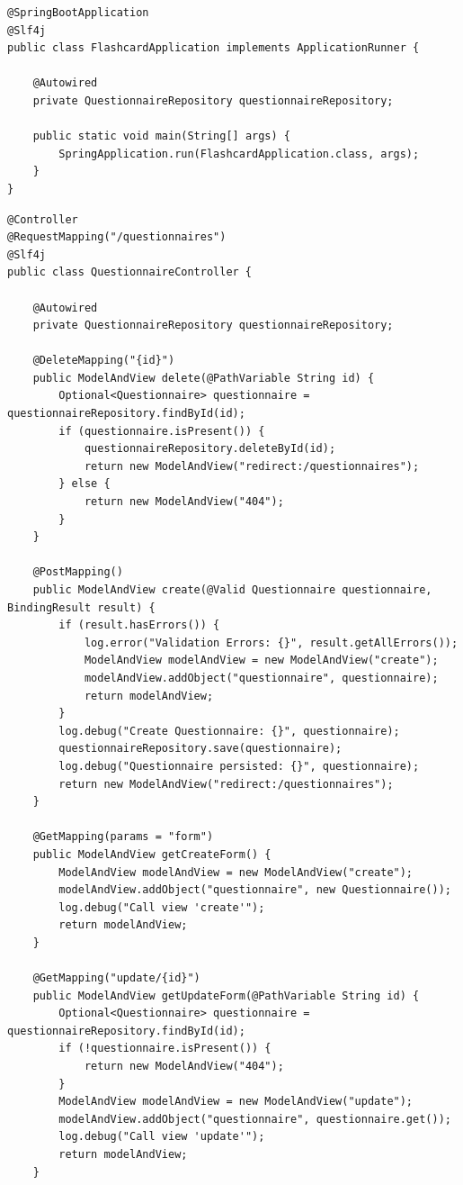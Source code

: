 \begin{verbatim}
@SpringBootApplication
@Slf4j
public class FlashcardApplication implements ApplicationRunner {
 
    @Autowired
    private QuestionnaireRepository questionnaireRepository;
 
    public static void main(String[] args) {
        SpringApplication.run(FlashcardApplication.class, args);
    }
}
\end{verbatim}
\begin{verbatim}
@Controller
@RequestMapping("/questionnaires")
@Slf4j
public class QuestionnaireController {
 
    @Autowired
    private QuestionnaireRepository questionnaireRepository;
 
    @DeleteMapping("{id}")
    public ModelAndView delete(@PathVariable String id) {
        Optional<Questionnaire> questionnaire = questionnaireRepository.findById(id);
        if (questionnaire.isPresent()) {
            questionnaireRepository.deleteById(id);
            return new ModelAndView("redirect:/questionnaires");
        } else {
            return new ModelAndView("404");
        }
    }
 
    @PostMapping()
    public ModelAndView create(@Valid Questionnaire questionnaire, BindingResult result) {
        if (result.hasErrors()) {
            log.error("Validation Errors: {}", result.getAllErrors());
            ModelAndView modelAndView = new ModelAndView("create");
            modelAndView.addObject("questionnaire", questionnaire);
            return modelAndView;
        }
        log.debug("Create Questionnaire: {}", questionnaire);
        questionnaireRepository.save(questionnaire);
        log.debug("Questionnaire persisted: {}", questionnaire);
        return new ModelAndView("redirect:/questionnaires");
    }
 
    @GetMapping(params = "form")
    public ModelAndView getCreateForm() {
        ModelAndView modelAndView = new ModelAndView("create");
        modelAndView.addObject("questionnaire", new Questionnaire());
        log.debug("Call view 'create'");
        return modelAndView;
    }
 
    @GetMapping("update/{id}")
    public ModelAndView getUpdateForm(@PathVariable String id) {
        Optional<Questionnaire> questionnaire = questionnaireRepository.findById(id);
        if (!questionnaire.isPresent()) {
            return new ModelAndView("404");
        }
        ModelAndView modelAndView = new ModelAndView("update");
        modelAndView.addObject("questionnaire", questionnaire.get());
        log.debug("Call view 'update'");
        return modelAndView;
    }
 

\end{verbatim}
